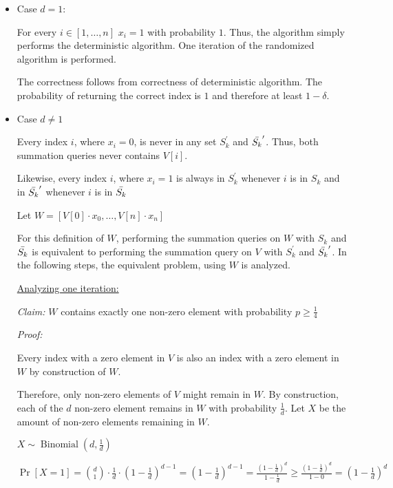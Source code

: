 \begin{itemize}
    \item Case $d = 1$:
    
    For every $i \in [1,\dots,n]$ $x_i = 1$ with probability $1$. Thus, the algorithm simply performs the deterministic algorithm. One iteration of the randomized algorithm is performed.

    The correctness follows from correctness of deterministic algorithm. The probability of returning the correct index is $1$ and therefore at least $1 - \delta$.
    
    \item Case $d \neq 1$
    
    Every index $i$, where $x_i = 0$, is never in any set $S_k^\prime$ and $\Bar{S_k}^\prime$. Thus, both summation queries never contains $V[i]$. 
    
    Likewise, every index $i$, where $x_i = 1$ is always in $S_k^\prime$ whenever $i$ is in $S_k$ and in $\Bar{S_k}^\prime$ whenever $i$ is in $\Bar{S_k}$
    
    Let $W = [V[0]\cdot x_0,\dots,V[n]\cdot x_n]$
    
    For this definition of $W$, performing the summation queries on $W$ with $S_k$ and $\Bar{S_k}$ is equivalent to performing the summation query on $V$ with $S_k^\prime$ and $\Bar{S_k}^\prime$. In the following steps, the equivalent problem, using $W$ is analyzed.
    
    
    \underline{Analyzing one iteration:}
    
    \textit{Claim:} $W$ contains exactly one non-zero element with probability $p \geq \frac{1}{4}$
    
    \textit{Proof:} 
    
    Every index with a zero element in $V$ is also an index with a zero element in $W$ by construction of $W$.
    
    Therefore, only non-zero elements of $V$ might remain in $W$. By construction, each of the $d$ non-zero element remains in $W$ with probability $\frac{1}{d}$. Let $X$ be the amount of non-zero elements remaining in $W$.
    
    $X \sim \operatorname{Binomial}\left(d, \frac{1}{d}\right)$
    
    $\Pr[X = 1] = 
    {d \choose 1} \cdot \frac{1}{d} \cdot \left(1 - \frac{1}{d}\right)^{d-1} = 
    \left(1 - \frac{1}{d}\right)^{d-1} =
    \frac{\left(1 - \frac{1}{d}\right)^{d} }{1 - \frac{1}{d}} \geq
    \frac{\left(1 - \frac{1}{d}\right)^{d} }{1 - 0} = 
    \left(1 - \frac{1}{d}\right)^{d} 
    $ 
    

\end{itemize}
